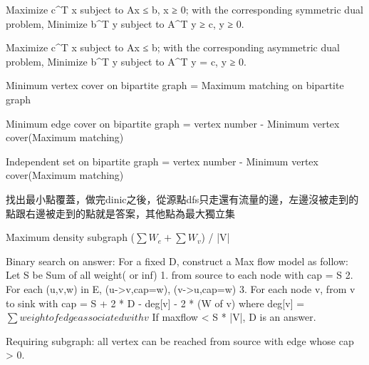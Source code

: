 Maximize c^T x subject to Ax ≤ b, x ≥ 0;
with the corresponding symmetric dual problem,
Minimize b^T y subject to A^T y ≥ c, y ≥ 0.

Maximize c^T x subject to Ax ≤ b;
with the corresponding asymmetric dual problem,
Minimize b^T y subject to A^T y = c, y ≥ 0. 

Minimum vertex cover on bipartite graph =
Maximum matching on bipartite graph

Minimum edge cover on bipartite graph =
vertex number - Minimum vertex cover(Maximum matching)

Independent set on bipartite graph =
vertex number - Minimum vertex cover(Maximum matching)

找出最小點覆蓋，做完dinic之後，從源點dfs只走還有流量的邊，左邊沒被走到的點跟右邊被走到的點就是答案，其他點為最大獨立集

Maximum density subgraph ($\sum W_e+\sum W_v$) / |V|

Binary search on answer:
For a fixed D, construct a Max flow model as follow:
Let S be Sum of all weight( or inf)
1. from source to each node with cap = S
2. For each (u,v,w) in E, (u->v,cap=w), (v->u,cap=w)
3. For each node v, from v to sink with cap = S + 2 * D - deg[v] - 2 * (W of v)
where deg[v] = $\sum weight of edge associated with v$
If maxflow < S * |V|, D is an answer.

Requiring subgraph: all vertex can be reached from source with
edge whose cap > 0.